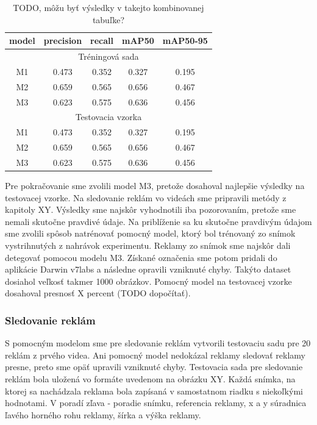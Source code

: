 \begin{table}
\centering
\begin{tabular}{ |c c c c c|  }
\hline
model & precision & recall & mAP50 & mAP50-95 \\ 
\hline
\hline
\multicolumn{5}{|c|}{Tréningová sada} \\
\hline
M1  & 0.473	& 0.352	& 0.327	& 0.195 \\
M2  & 0.659 & 0.565 & 0.656 & 0.467 \\
M3  & 0.623 & 0.575 & 0.636 & 0.456 \\
\hline
\hline
 \multicolumn{5}{|c|}{Testovacia vzorka} \\
\hline
M1  & 0.473	& 0.352	& 0.327	& 0.195 \\
M2  & 0.659 & 0.565 & 0.656 & 0.467 \\
M3  & 0.623 & 0.575 & 0.636 & 0.456 \\
\hline
\end{tabular}
\caption{TODO, môžu byť výsledky v takejto kombinovanej tabuľke?}
\label{table:test}
\end{table}

Pre pokračovanie sme zvolili model M3, pretože dosahoval najlepšie výsledky na testovacej vzorke. Na sledovanie reklám vo videách sme pripravili metódy z kapitoly XY. Výsledky sme najskôr vyhodnotili iba pozorovaním, pretože sme nemali skutočne pravdivé údaje. Na priblíženie sa ku skutočne pravdivým údajom sme zvolili spôsob natrénovať pomocný model, ktorý bol trénovaný zo snímok vystrihnutých z nahrávok experimentu. Reklamy zo snímok sme najskôr dali detegovať pomocou modelu M3. Získané označenia sme potom pridali do aplikácie Darwin v7labs a následne opravili vzniknuté chyby. Takýto dataset dosiahol veľkosť takmer 1000 obrázkov. Pomocný model na testovacej vzorke dosahoval presnosť X percent (TODO dopočítať).

\subsubsection{Sledovanie reklám}

S pomocným modelom sme pre sledovanie reklám vytvorili testovaciu sadu pre 20 reklám z prvého videa. Ani pomocný model nedokázal reklamy sledovať reklamy presne, preto sme opäť upravili vzniknuté chyby. Testovacia sada pre sledovanie reklám bola uložená vo formáte uvedenom na obrázku XY. Každá snímka, na ktorej sa nachádzala reklama bola zapísaná v samostatnom riadku s niekoľkými hodnotami. V poradí zľava - poradie snímku, referencia reklamy, x a y súradnica ľavého horného rohu reklamy, šírka a výška reklamy.


